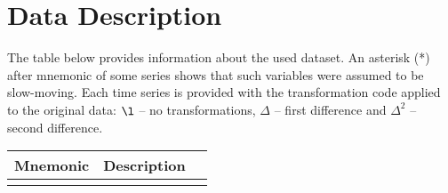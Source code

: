 \documentclass[a4paper, 14pt]{article}
\begin{document}
\section{Data Description}
The table below provides information about the used dataset. An asterisk (*) after mnemonic of some series shows that such variables were assumed to be slow-moving. Each time series is provided with the transformation code applied to the original data: $\l$ -- no transformations, $\Delta$ -- first difference and $\Delta^2$ -- second difference. 
\begin{center}
	\begin{longtable}{p{5.5cm} p{10cm} p{0.15cm}}
		
		\hline \hline \multicolumn{1}{c}{\textbf{Mnemonic}} & \multicolumn{1}{c}{\textbf{Description}} & \multicolumn{1}{c}{\textbf{}} \\ \hline 
		\endfirsthead
		
		
	
		\endhead
		
		
		\endfoot
		
		\hline \hline
		\endlastfoot
		

\end{longtable}
\end{center}
\end{document}

